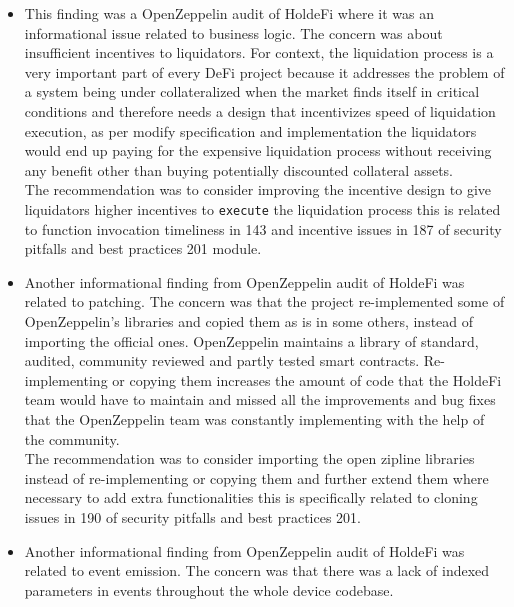 \begin{itemize}
\item
  This finding was a OpenZeppelin audit of HoldeFi where it was an
  informational issue related to business logic. The concern was about
  insufficient incentives to liquidators. For context, the liquidation
  process is a very important part of every DeFi project because it
  addresses the problem of a system being under collateralized when the
  market finds itself in critical conditions and therefore needs a
  design that incentivizes speed of liquidation execution, as per modify
  specification and implementation the liquidators would end up paying
  for the expensive liquidation process without receiving any benefit
  other than buying potentially discounted collateral assets.\\

  The recommendation was to consider improving the incentive design to
  give liquidators higher incentives to \texttt{execute} the liquidation
  process this is related to function invocation timeliness in 143 and
  incentive issues in 187 of security pitfalls and best practices 201
  module.
\item
  Another informational finding from OpenZeppelin audit of HoldeFi was
  related to patching. The concern was that the project re-implemented
  some of OpenZeppelin's libraries and copied them as is in some others,
  instead of importing the official ones. OpenZeppelin maintains a
  library of standard, audited, community reviewed and partly tested
  smart contracts. Re-implementing or copying them increases the amount
  of code that the HoldeFi team would have to maintain and missed all
  the improvements and bug fixes that the OpenZeppelin team was
  constantly implementing with the help of the community.\\

  The recommendation was to consider importing the open zipline
  libraries instead of re-implementing or copying them and further
  extend them where necessary to add extra functionalities this is
  specifically related to cloning issues in 190 of security pitfalls and
  best practices 201.
\item
  Another informational finding from OpenZeppelin audit of HoldeFi was
  related to event emission. The concern was that there was a lack of
  indexed parameters in events throughout the whole device codebase.\\


\end{itemize}
